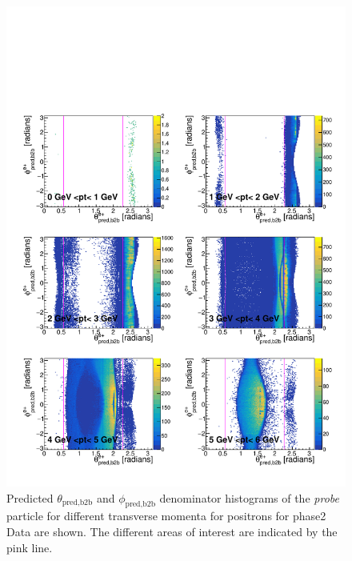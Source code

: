 \documentclass[a4paper,11pt,twosided,final,german,openbib,pdftex,listof=totoc,bibliography=totoc]{scrbook}
\begin{document}
\begin{appendix}
\begin{figure}[h!]
	\includegraphics[width=\textwidth]{Plots/master/RTPtMepD_Data.pdf}
	\caption[Denominator $\theta_{\textrm{pred,b2b}}$-$\phi_{\textrm{pred,b2b}}$ Positron Transverse Momentum Phase2 Data]{Predicted $\theta_{\textrm{pred,b2b}}$ and $\phi_{\textrm{pred,b2b}}$ denominator histograms of the \textit{probe} particle for different transverse momenta for positrons for phase2 Data are shown. The different areas of interest are indicated by the pink line.}
	\label{plt:RTtPMepD_Data}
\end{figure}



\end{appendix}
\end{document}

